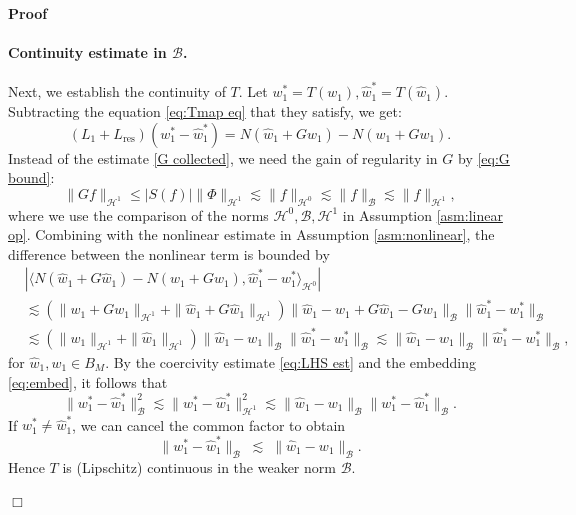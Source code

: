 \documentclass[11pt,a4paper]{article}
\numberwithin{equation}{section}
\newcommand{\tmop}[1]{\ensuremath{\operatorname{#1}}}
\newenvironment{proof}{\noindent\textbf{Proof\ }}{\hspace*{\fill}$\Box$\medskip}
\begin{document}
\begin{proof}
  \paragraph{Continuity estimate in $\mathcal{B}$.}
  Next, we establish the continuity of $T$. Let $w_1^{\ast} = T
  (w_1), \widehat{w}_1^{\ast} = T (\widehat{w}_1)$. Subtracting the equation \eqref{eq:Tmap eq} that they satisfy, we get:
  \[ (L_1 + L_{\tmop{res}})  (w_1^{\ast} - \widehat{w}_1^{\ast}) = N
     (\widehat{w}_1 + G \widehat{w}_1) - N (w_1 + G w_1) . \]
     Instead of the estimate \eqref{G collected}, we need the gain of regularity in $G$ by \eqref{eq:G bound}:
  \begin{equation*} \| G f \|_{\mathcal{H}^1}  \leqslant | S (f) | \| \Phi
     \|_{\mathcal{H}^1} \lesssim \| f \|_{\mathcal{H}^0} \lesssim \| f \|_{\mathcal{B}} \lesssim \| f \|_{\mathcal{H}^1} 
     , \label{G gain} \end{equation*}
     where we use the comparison of the norms ${\mathcal{H}^0},\mathcal{B},\mathcal{H}^1$ in Assumption \ref{asm:linear op}.
  Combining with the nonlinear estimate in Assumption \ref{asm:nonlinear}, %
    the difference between the nonlinear term is
  bounded by\begin{equation}
  \begin{aligned}
    & | \langle N (\widehat{w}_1 + G \widehat{w}_1) - N (w_1 + G w_1),
    \widehat{w}_1^{\ast} - w_1^{\ast} \rangle_{\mathcal{H}^0} | \nonumber\\
    &\lesssim   (\| w_1 + G w_1 \|_{\mathcal{H}^1} + \| \widehat{w}_1 +
    G \widehat{w}_1 \|_{\mathcal{H}^1}) \| \widehat{w}_1 - w_1 + G \widehat{w}_1
    - G w_1 \|_{\mathcal{B}} \| \widehat{w}_1^{\ast} - w_1^{\ast}
    \|_{\mathcal{B}} \nonumber\\
     &\lesssim   (\| w_1 \|_{\mathcal{H}^1} + \|
    \widehat{w}_1 \|_{\mathcal{H}^1}) \| \widehat{w}_1 - w_1 \|_{\mathcal{B}} \|
    \widehat{w}_1^{\ast} - w_1^{\ast} \|_{\mathcal{B}} 
    \lesssim    \|
    \widehat{w}_1 - w_1 \|_{\mathcal{B}} \| \widehat{w}_1^{\ast} - w_1^{\ast}
    \|_{\mathcal{B}} ,  \label{eq:nonlin diff est}
  \end{aligned}    
  \end{equation}
  for $\widehat{w}_1, {w}_1\in B_{M}$. 
  By the coercivity estimate \eqref{eq:LHS est} and the embedding \eqref{eq:embed}, it follows that
  \[ \| w_1^{\ast} - \widehat{w}_1^{\ast} \|^2_{\mathcal{B}} \lesssim\| w_1^{\ast} - \widehat{w}_1^{\ast} \|^2_{\mathcal{H}^1} \lesssim  \| \widehat{w}_1 - w_1
     \|_{\mathcal{B}}\| w_1^{\ast} - \widehat{w}_1^{\ast} \|_{\mathcal{B}} . \]
If $w_1^{\ast}\neq \widehat{w}_1^{\ast}$, we can cancel the common factor to obtain
\[
\| w_1^{\ast} - \widehat{w}_1^{\ast} \|_{\mathcal B}
\;\lesssim\; \| \widehat{w}_1 - w_1 \|_{\mathcal B}.
\]
Hence $T$ is (Lipschitz) continuous in the weaker norm $\mathcal B$.
  

\end{proof}
\end{document}
